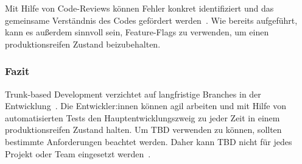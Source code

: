 Mit Hilfe von Code\hyp Reviews können Fehler konkret identifiziert und das gemeinsame Verständnis des Codes gefördert werden~\cite{trunkbased_bestpractice1}. Wie bereits aufgeführt, kann es außerdem sinnvoll sein, Feature\hyp Flags zu verwenden, um einen produktionsreifen Zustand beizubehalten.


\subsubsection{Fazit}

Trunk\hyp based Development verzichtet auf langfristige Branches in der Entwicklung~\cite{trunkbased6}. Die Entwickler:innen können agil arbeiten und mit Hilfe von automatisierten Tests den Hauptentwicklungszweig zu jeder Zeit in einem produktionsreifen Zustand halten. Um TBD verwenden zu können, sollten bestimmte Anforderungen beachtet werden. Daher kann TBD nicht für jedes Projekt oder Team eingesetzt werden~\cite{Manturewicz_trunk-based_2023}.
